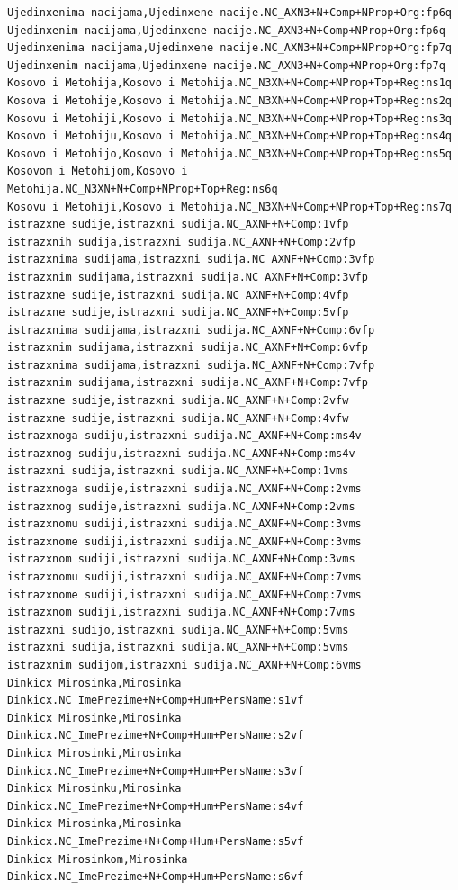\begin{verbatim}
Ujedinxenima nacijama,Ujedinxene nacije.NC_AXN3+N+Comp+NProp+Org:fp6q
Ujedinxenim nacijama,Ujedinxene nacije.NC_AXN3+N+Comp+NProp+Org:fp6q
Ujedinxenima nacijama,Ujedinxene nacije.NC_AXN3+N+Comp+NProp+Org:fp7q
Ujedinxenim nacijama,Ujedinxene nacije.NC_AXN3+N+Comp+NProp+Org:fp7q
Kosovo i Metohija,Kosovo i Metohija.NC_N3XN+N+Comp+NProp+Top+Reg:ns1q
Kosova i Metohije,Kosovo i Metohija.NC_N3XN+N+Comp+NProp+Top+Reg:ns2q
Kosovu i Metohiji,Kosovo i Metohija.NC_N3XN+N+Comp+NProp+Top+Reg:ns3q
Kosovo i Metohiju,Kosovo i Metohija.NC_N3XN+N+Comp+NProp+Top+Reg:ns4q
Kosovo i Metohijo,Kosovo i Metohija.NC_N3XN+N+Comp+NProp+Top+Reg:ns5q
Kosovom i Metohijom,Kosovo i Metohija.NC_N3XN+N+Comp+NProp+Top+Reg:ns6q
Kosovu i Metohiji,Kosovo i Metohija.NC_N3XN+N+Comp+NProp+Top+Reg:ns7q
istrazxne sudije,istrazxni sudija.NC_AXNF+N+Comp:1vfp
istrazxnih sudija,istrazxni sudija.NC_AXNF+N+Comp:2vfp
istrazxnima sudijama,istrazxni sudija.NC_AXNF+N+Comp:3vfp
istrazxnim sudijama,istrazxni sudija.NC_AXNF+N+Comp:3vfp
istrazxne sudije,istrazxni sudija.NC_AXNF+N+Comp:4vfp
istrazxne sudije,istrazxni sudija.NC_AXNF+N+Comp:5vfp
istrazxnima sudijama,istrazxni sudija.NC_AXNF+N+Comp:6vfp
istrazxnim sudijama,istrazxni sudija.NC_AXNF+N+Comp:6vfp
istrazxnima sudijama,istrazxni sudija.NC_AXNF+N+Comp:7vfp
istrazxnim sudijama,istrazxni sudija.NC_AXNF+N+Comp:7vfp
istrazxne sudije,istrazxni sudija.NC_AXNF+N+Comp:2vfw
istrazxne sudije,istrazxni sudija.NC_AXNF+N+Comp:4vfw
istrazxnoga sudiju,istrazxni sudija.NC_AXNF+N+Comp:ms4v
istrazxnog sudiju,istrazxni sudija.NC_AXNF+N+Comp:ms4v
istrazxni sudija,istrazxni sudija.NC_AXNF+N+Comp:1vms
istrazxnoga sudije,istrazxni sudija.NC_AXNF+N+Comp:2vms
istrazxnog sudije,istrazxni sudija.NC_AXNF+N+Comp:2vms
istrazxnomu sudiji,istrazxni sudija.NC_AXNF+N+Comp:3vms
istrazxnome sudiji,istrazxni sudija.NC_AXNF+N+Comp:3vms
istrazxnom sudiji,istrazxni sudija.NC_AXNF+N+Comp:3vms
istrazxnomu sudiji,istrazxni sudija.NC_AXNF+N+Comp:7vms
istrazxnome sudiji,istrazxni sudija.NC_AXNF+N+Comp:7vms
istrazxnom sudiji,istrazxni sudija.NC_AXNF+N+Comp:7vms
istrazxni sudijo,istrazxni sudija.NC_AXNF+N+Comp:5vms
istrazxni sudija,istrazxni sudija.NC_AXNF+N+Comp:5vms
istrazxnim sudijom,istrazxni sudija.NC_AXNF+N+Comp:6vms
Dinkicx Mirosinka,Mirosinka Dinkicx.NC_ImePrezime+N+Comp+Hum+PersName:s1vf
Dinkicx Mirosinke,Mirosinka Dinkicx.NC_ImePrezime+N+Comp+Hum+PersName:s2vf
Dinkicx Mirosinki,Mirosinka Dinkicx.NC_ImePrezime+N+Comp+Hum+PersName:s3vf
Dinkicx Mirosinku,Mirosinka Dinkicx.NC_ImePrezime+N+Comp+Hum+PersName:s4vf
Dinkicx Mirosinka,Mirosinka Dinkicx.NC_ImePrezime+N+Comp+Hum+PersName:s5vf
Dinkicx Mirosinkom,Mirosinka Dinkicx.NC_ImePrezime+N+Comp+Hum+PersName:s6vf

\end{verbatim}
